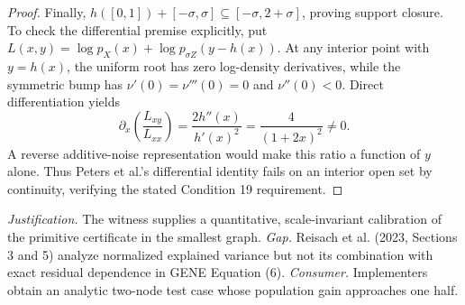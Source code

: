\documentclass{article}
\begin{document}
\begin{proof}
Finally, \(h([0,1])+[-\sigma,\sigma]\subseteq[-\sigma,2+\sigma]\), proving support closure.  To check the differential premise explicitly, put \(L(x,y)=\log p_X(x)+\log p_{\sigma Z}(y-h(x))\).  At any interior point with \(y=h(x)\), the uniform root has zero log-density derivatives, while the symmetric bump has \(\nu'(0)=\nu'''(0)=0\) and \(\nu''(0)<0\).  Direct differentiation yields
\[
 \partial_x\!\left(\frac{L_{xy}}{L_{xx}}\right)
 =\frac{2h''(x)}{h'(x)^2}=\frac{4}{(1+2x)^2}\ne0.
\]
A reverse additive-noise representation would make this ratio a function of \(y\) alone.  Thus Peters et al.'s differential identity fails on an interior open set by continuity, verifying the stated Condition 19 requirement.
\end{proof}
\par\smallskip\noindent \textit{Justification.} The witness supplies a quantitative, scale-invariant calibration of the primitive certificate in the smallest graph. \textit{Gap.} Reisach et al. (2023, Sections 3 and 5) analyze normalized explained variance but not its combination with exact residual dependence in GENE Equation (6). \textit{Consumer.} Implementers obtain an analytic two-node test case whose population gain approaches one half.
\end{document}
